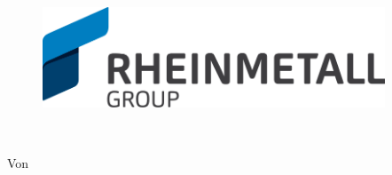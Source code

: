 \begin{titlepage}
\pagestyle{empty}

\begin{flushright}
\begin{figure}[ht]
\flushright
\includegraphics[height=3cm]{pictures/logo.png}
\end{figure}
\end{flushright}

\begin{center}
\vspace{1cm}
\begin{onehalfspace}
{\fontsize{22}{26} \selectfont \textbf{\docTitle}}\\[5mm]
{\fontsize{18}{22} \selectfont \docUntertitle}


\end{onehalfspace}
\end{center}

    \begin{center}
        Von \docVorname~\docNachname\\
 	    \docAbgabedatum
    \end{center}
\end{titlepage}

